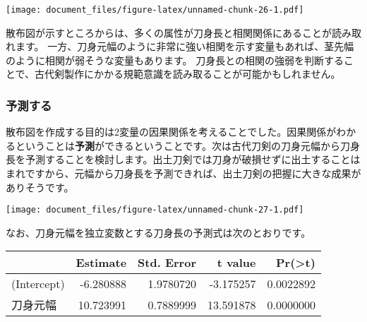 \documentclass[]{article}
\newenvironment{Shaded}{\begin{snugshade}}{\end{snugshade}}
\newcommand{\DataTypeTok}[1]{\textcolor[rgb]{0.13,0.29,0.53}{#1}}
\newcommand{\KeywordTok}[1]{\textcolor[rgb]{0.13,0.29,0.53}{\textbf{#1}}}
\newcommand{\NormalTok}[1]{#1}
\newcommand{\OperatorTok}[1]{\textcolor[rgb]{0.81,0.36,0.00}{\textbf{#1}}}
\newcommand{\StringTok}[1]{\textcolor[rgb]{0.31,0.60,0.02}{#1}}
\begin{document}
\texttt{[image: document\_files/figure-latex/unnamed-chunk-26-1.pdf]}

散布図が示すところからは、多くの属性が刀身長と相関関係にあることが読み取れます。
一方、刀身元幅のように非常に強い相関を示す変量もあれば、茎先幅のように相関が弱そうな変量もあります。
刀身長との相関の強弱を判断することで、古代剣製作にかかる規範意識を読み取ることが可能かもしれません。

\subsubsection{予測する}

散布図を作成する目的は2変量の因果関係を考えることでした。因果関係がわかるということは\textbf{予測}ができるということです。次は古代刀剣の刀身元幅から刀身長を予測することを検討します。出土刀剣では刀身が破損せずに出土することはまれですから、元幅から刀身長を予測できれば、出土刀剣の把握に大きな成果がありそうです。

\begin{Shaded}
\end{Shaded}

\texttt{[image: document\_files/figure-latex/unnamed-chunk-27-1.pdf]}

なお、刀身元幅を独立変数とする刀身長の予測式は次のとおりです。

\begin{Shaded}
\end{Shaded}

\begin{longtable}[]{@{}lrrrr@{}}
\toprule
& Estimate & Std. Error & t value &
Pr(\textgreater{}\textbar{}t\textbar{})\tabularnewline
\midrule
\endhead
(Intercept) & -6.280888 & 1.9780720 & -3.175257 &
0.0022892\tabularnewline
刀身元幅 & 10.723991 & 0.7889999 & 13.591878 & 0.0000000\tabularnewline
\bottomrule
\end{longtable}
\end{document}
